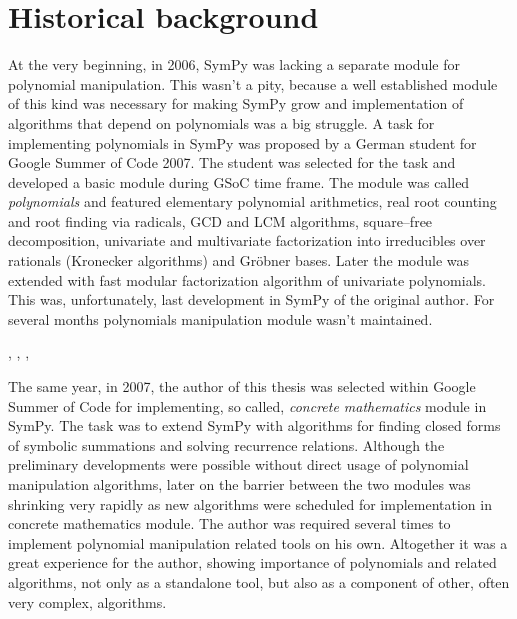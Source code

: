 \section{Historical background}

At the very beginning, in 2006, SymPy was lacking a separate module for polynomial manipulation.
This wasn't a pity, because a well established module of this kind was necessary for making SymPy
grow and implementation of algorithms that depend on polynomials was a big struggle. A task for
implementing polynomials in SymPy was proposed by a German student for Google Summer of Code 2007.
The student was selected for the task and developed a basic module during GSoC time frame. The module
was called \emph{polynomials} and featured elementary polynomial arithmetics, real root counting and root
finding via radicals, GCD and LCM algorithms, square--free decomposition, univariate and multivariate
factorization into irreducibles over rationals (Kronecker algorithms) and Gröbner bases. Later the
module was extended with fast modular factorization algorithm of univariate polynomials. This was,
unfortunately, last development in SymPy of the original author. For several months polynomials
manipulation module wasn't maintained.

\cite{Abramov1995rational},
\cite{Petkovsek1992hyper},
\cite{Nemes1997monthly},
\cite{Petkovsek1997AeqB}

The same year, in 2007, the author of this thesis was selected within Google Summer of Code for
implementing, so called, \emph{concrete mathematics} module in SymPy. The task was to extend SymPy
with algorithms for finding closed forms of symbolic summations and solving recurrence relations.
Although the preliminary developments were possible without direct usage of polynomial manipulation
algorithms, later on the barrier between the two modules was shrinking very rapidly as new algorithms
were scheduled for implementation in concrete mathematics module. The author was required several
times to implement polynomial manipulation related tools on his own. Altogether it was a great
experience for the author, showing importance of polynomials and related algorithms, not only as
a standalone tool, but also as a component of other, often very complex, algorithms.

